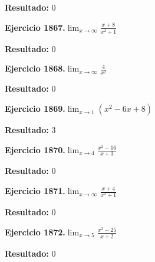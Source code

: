 \documentclass[10pt,a4paper]{article}
\begin{document}
\begin{solbox}
\textbf{Resultado:} \(\displaystyle 0\)
\end{solbox}

\newpage
\begin{ejbox}
\textbf{Ejercicio 1867.}\quad $\lim_{x\to \infty} \frac{x + 8}{x^2 + 1}$
\end{ejbox}

\begin{solbox}
\textbf{Resultado:} \(\displaystyle 0\)
\end{solbox}

\begin{ejbox}
\textbf{Ejercicio 1868.}\quad $\lim_{x\to \infty} \frac{4}{x^2}$
\end{ejbox}

\begin{solbox}
\textbf{Resultado:} \(\displaystyle 0\)
\end{solbox}

\begin{ejbox}
\textbf{Ejercicio 1869.}\quad $\lim_{x\to 1} (x^2 -6x +8)$
\end{ejbox}

\begin{solbox}
\textbf{Resultado:} \(\displaystyle 3\)
\end{solbox}

\newpage
\begin{ejbox}
\textbf{Ejercicio 1870.}\quad $\lim_{x\to 4} \frac{x^2-16}{x+3}$
\end{ejbox}

\begin{solbox}
\textbf{Resultado:} \(\displaystyle 0\)
\end{solbox}

\begin{ejbox}
\textbf{Ejercicio 1871.}\quad $\lim_{x\to \infty} \frac{x + 4}{x^2 + 1}$
\end{ejbox}

\begin{solbox}
\textbf{Resultado:} \(\displaystyle 0\)
\end{solbox}

\begin{ejbox}
\textbf{Ejercicio 1872.}\quad $\lim_{x\to 5} \frac{x^2-25}{x+2}$
\end{ejbox}

\begin{solbox}
\textbf{Resultado:} \(\displaystyle 0\)
\end{solbox}
\end{document}
